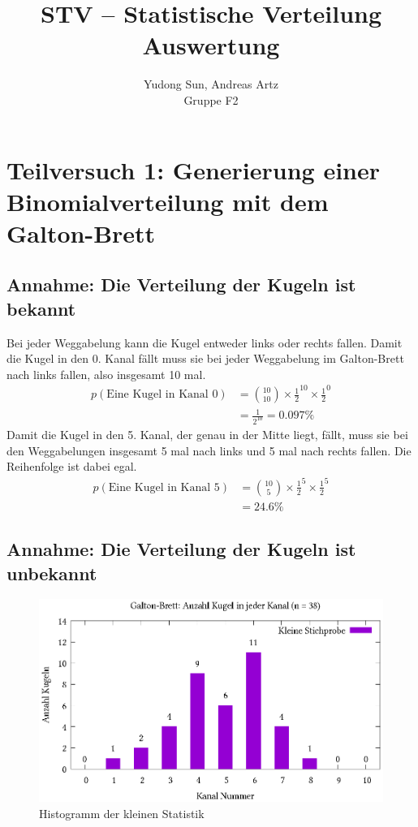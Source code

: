 \documentclass[twoside]{article}
\title{STV -- Statistische Verteilung \\ Auswertung}
\author{Yudong Sun, Andreas Artz \\ Gruppe F2}
\begin{document}
\maketitle

\section*{Teilversuch 1: Generierung einer Binomialverteilung mit dem Galton-Brett}

    \subsection*{Annahme: Die Verteilung der Kugeln ist bekannt}
        Bei jeder Weggabelung kann die Kugel entweder links oder rechts fallen. Damit die Kugel in den 0. Kanal fällt muss sie bei jeder Weggabelung im Galton-Brett nach links fallen, also insgesamt 10 mal. 
        \begin{align*}
            p(\text{Eine Kugel in Kanal 0}) &=\binom{10}{10} \times \frac{1}{2}^{10} \times \frac{1}{2}^0 \\
            &= \frac{1}{2^{10}} = 0.097\% 
        \end{align*}
        Damit die Kugel in den 5. Kanal, der genau in der Mitte liegt, fällt, muss sie bei den Weggabelungen insgesamt 5 mal nach links und 5 mal nach rechts fallen. Die Reihenfolge ist dabei egal.
        \begin{align*}
            p(\text{Eine Kugel in Kanal 5}) &=\binom{10}{5} \times \frac{1}{2}^{5} \times \frac{1}{2}^{5} \\
            &= 24.6\% 
        \end{align*}
        
    \pagebreak
    \subsection*{Annahme: Die Verteilung der Kugeln ist unbekannt}
    
        \begin{figure}[!ht]
            \centering
            \includegraphics{kleine.eps}
            \caption{Histogramm der kleinen Statistik}
            \label{fig:kleine_histo}
        \end{figure}
        
\end{document}
